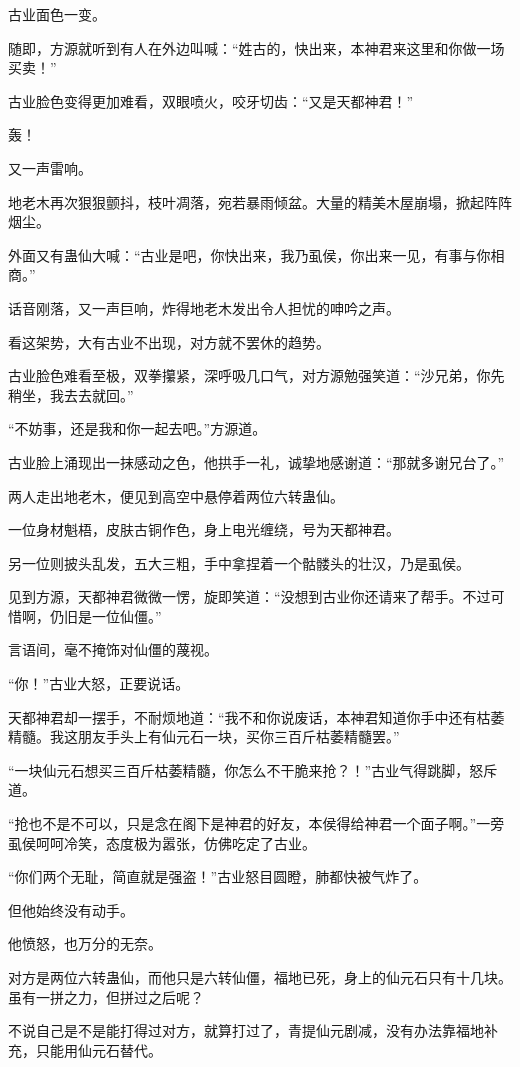 \begin{this_body}
古业面色一变。

随即，方源就听到有人在外边叫喊：“姓古的，快出来，本神君来这里和你做一场买卖！”

古业脸色变得更加难看，双眼喷火，咬牙切齿：“又是天都神君！”

轰！

又一声雷响。

地老木再次狠狠颤抖，枝叶凋落，宛若暴雨倾盆。大量的精美木屋崩塌，掀起阵阵烟尘。

外面又有蛊仙大喊：“古业是吧，你快出来，我乃虱侯，你出来一见，有事与你相商。”

话音刚落，又一声巨响，炸得地老木发出令人担忧的呻吟之声。

看这架势，大有古业不出现，对方就不罢休的趋势。

古业脸色难看至极，双拳攥紧，深呼吸几口气，对方源勉强笑道：“沙兄弟，你先稍坐，我去去就回。”

“不妨事，还是我和你一起去吧。”方源道。

古业脸上涌现出一抹感动之色，他拱手一礼，诚挚地感谢道：“那就多谢兄台了。”

两人走出地老木，便见到高空中悬停着两位六转蛊仙。

一位身材魁梧，皮肤古铜作色，身上电光缠绕，号为天都神君。

另一位则披头乱发，五大三粗，手中拿捏着一个骷髅头的壮汉，乃是虱侯。

见到方源，天都神君微微一愣，旋即笑道：“没想到古业你还请来了帮手。不过可惜啊，仍旧是一位仙僵。”

言语间，毫不掩饰对仙僵的蔑视。

“你！”古业大怒，正要说话。

天都神君却一摆手，不耐烦地道：“我不和你说废话，本神君知道你手中还有枯萎精髓。我这朋友手头上有仙元石一块，买你三百斤枯萎精髓罢。”

“一块仙元石想买三百斤枯萎精髓，你怎么不干脆来抢？！”古业气得跳脚，怒斥道。

“抢也不是不可以，只是念在阁下是神君的好友，本侯得给神君一个面子啊。”一旁虱侯呵呵冷笑，态度极为嚣张，仿佛吃定了古业。

“你们两个无耻，简直就是强盗！”古业怒目圆瞪，肺都快被气炸了。

但他始终没有动手。

他愤怒，也万分的无奈。

对方是两位六转蛊仙，而他只是六转仙僵，福地已死，身上的仙元石只有十几块。虽有一拼之力，但拼过之后呢？

不说自己是不是能打得过对方，就算打过了，青提仙元剧减，没有办法靠福地补充，只能用仙元石替代。


\end{this_body}
